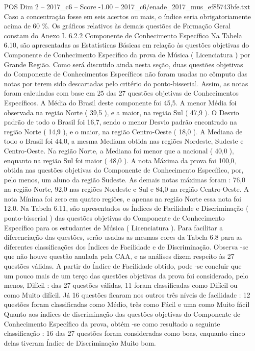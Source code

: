 \begin{textsample}{POS Dim 2 – 2017\_c6 – Score -1.00 – 2017\_c6/enade\_2017\_mus\_ef85743bfe.txt}
Caso a concentração fosse em seis acertos ou mais, o índice seria obrigatoriamente acima de 60 \%.
Os gráficos relativos às demais questões de Formação Geral constam do Anexo I. 6.2.2 Componente de Conhecimento Específico Na Tabela 6.10, são apresentadas as Estatísticas Básicas em relação às questões objetivas do Componente de Conhecimento Específico da prova de Música ( Licenciatura ) por Grande Região.
Como será discutido ainda nesta seção, duas questões objetivas do Componente de Conhecimentos Específicos não foram usadas no cômputo das notas por terem sido descartadas pelo critério do ponto-bisserial.
Assim, as notas foram calculadas com base em 25 das 27 questões objetivas de Conhecimentos Específicos.
A Média do Brasil deste componente foi 45,5.
A menor Média foi observada na região Norte ( 39,5 ), e a maior, na região Sul ( 47,9 ).
O Desvio padrão de todo o Brasil foi 16,7, sendo o menor Desvio padrão encontrado na região Norte ( 14,9 ), e o maior, na região Centro-Oeste ( 18,0 ).
A Mediana de todo o Brasil foi 44,0, a mesma Mediana obtida nas regiões Nordeste, Sudeste e Centro-Oeste.
Na região Norte, a Mediana foi menor que a nacional ( 40,0 ), enquanto na região Sul foi maior ( 48,0 ).
A nota Máxima da prova foi 100,0, obtida nas questões objetivas do Componente de Conhecimento Específico, por, pelo menos, um aluno da região Sudeste.
As demais notas máximas foram : 76,0 na região Norte, 92,0 nas regiões Nordeste e Sul e 84,0 na região Centro-Oeste.
A nota Mínima foi zero em quatro regiões, e apenas na região Norte essa nota foi 12,0.
Na Tabela 6.11, são apresentados os Índices de Facilidade e Discriminação ( ponto-bisserial ) das questões objetivas do Componente de Conhecimento Específico para os estudantes de Música ( Licenciatura ).
Para facilitar a diferenciação das questões, serão usadas as mesmas cores da Tabela 6.8 para as diferentes classificações dos Índices de Facilidade e de Discriminação.
Observa -se que não houve questão anulada pela CAA, e as análises dizem respeito às 27 questões válidas.
A partir do Índice de Facilidade obtido, pode -se concluir que um pouco mais de um terço das questões objetivas da prova foi considerado, pelo menos, Difícil : das 27 questões válidas, 11 foram classificadas como Difícil ou como Muito difícil.
Já 16 questões ficaram nos outros três níveis de facilidade : 12 questões foram classificadas como Médio, três como Fácil e uma como Muito fácil Quanto aos índices de discriminação das questões objetivas do Componente de Conhecimento Específico da prova, obtém -se como resultado a seguinte classificação : 16 das 27 questões foram consideradas como boas, enquanto cinco delas tiveram Índice de Discriminação Muito bom.

\end{textsample}
